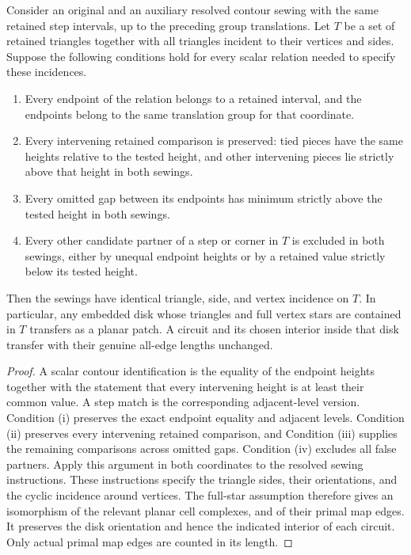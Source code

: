 \begin{lemma}\label{view:exact-incidence}
Consider an original and an auxiliary resolved contour sewing with the
same retained step intervals, up to the preceding group translations.
Let $T$ be a set of retained triangles together with all triangles incident
to their vertices and sides.  Suppose the following conditions hold for
every scalar relation needed to specify these incidences.
\begin{enumerate}[label=(\roman*)]
\item Every endpoint of the relation belongs to a retained interval, and
the endpoints belong to the same translation group for that coordinate.
\item Every intervening retained comparison is preserved: tied pieces
have the same heights relative to the tested height, and other intervening
pieces lie strictly above that height in both sewings.
\item Every omitted gap between its endpoints has minimum strictly above
the tested height in both sewings.
\item Every other candidate partner of a step or corner in $T$ is excluded
in both sewings, either by unequal endpoint heights or by a retained
value strictly below its tested height.
\end{enumerate}
Then the sewings have identical triangle, side, and vertex incidence on
$T$.  In particular, any embedded disk whose triangles and full vertex
stars are contained in $T$ transfers as a planar patch.  A circuit and its
chosen interior inside that disk transfer with their genuine all-edge
lengths unchanged.
\end{lemma}

\begin{proof}
A scalar contour identification is the equality of the endpoint heights
together with the statement that every intervening height is at least
their common value.  A step match is the corresponding adjacent-level
version.  Condition (i) preserves the exact endpoint equality and adjacent
levels.  Condition (ii) preserves every intervening retained comparison,
and Condition (iii) supplies the remaining comparisons across omitted
gaps.  Condition (iv) excludes all false partners.  Apply this argument in
both coordinates to the resolved sewing instructions.  These instructions
specify the triangle sides, their orientations, and the cyclic incidence
around vertices.  The full-star assumption therefore gives an isomorphism
of the relevant planar cell complexes, and of their primal map edges.
It preserves the disk orientation and hence the indicated interior of
each circuit.  Only actual primal map edges are counted in its length.
\end{proof}


